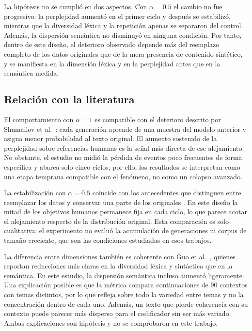 \documentclass[12pt,letterpaper]{article}
\begin{document}
La hipótesis no se cumplió en dos aspectos. Con \(\alpha=0.5\) el cambio no
fue progresivo: la perplejidad aumentó en el primer ciclo y después se
estabilizó, mientras que la diversidad léxica y la repetición apenas se
separaron del control. Además, la dispersión semántica no disminuyó en
ninguna condición. Por tanto, dentro de este diseño, el deterioro observado
depende más del reemplazo completo de los datos originales que de la mera
presencia de contenido sintético, y se manifiesta en la dimensión léxica
y en la perplejidad antes que en la semántica medida.

\subsection{Relación con la literatura}

El comportamiento con \(\alpha=1\) es compatible con el deterioro descrito
por Shumailov et al.\ \cite{shumailov2024}: cada generación aprende de una
muestra del modelo anterior y asigna menor probabilidad al texto original.
El aumento sostenido de la perplejidad sobre referencias humanas es la
señal más directa de ese alejamiento. No obstante, el estudio no midió la
pérdida de eventos poco frecuentes de forma específica y abarca solo cinco
ciclos; por ello, los resultados se interpretan como una etapa temprana
compatible con el fenómeno, no como un colapso avanzado.

La estabilización con \(\alpha=0.5\) coincide con los antecedentes que
distinguen entre reemplazar los datos y conservar una parte de los
originales \cite{gerstgrasser2024,kazdan2025}. En este diseño la mitad de
los objetivos humanos permanece fija en cada ciclo, lo que parece acotar
el alejamiento respecto de la distribución original. Esta comparación es
solo cualitativa: el experimento no evaluó la acumulación de generaciones
ni corpus de tamaño creciente, que son las condiciones estudiadas en esos
trabajos.

La diferencia entre dimensiones también es coherente con Guo et al.\
\cite{guo2024}, quienes reportan reducciones más claras en la diversidad
léxica y sintáctica que en la semántica. En este estudio, la dispersión
semántica incluso aumentó ligeramente. Una explicación posible es que la
métrica compara continuaciones de 90 contextos con temas distintos, por lo
que refleja sobre todo la variedad entre temas y no la concentración dentro
de cada uno. Además, un texto que pierde coherencia con su contexto puede
parecer más disperso para el codificador sin ser más variado. Ambas
explicaciones son hipótesis y no se comprobaron en este trabajo.
\end{document}
